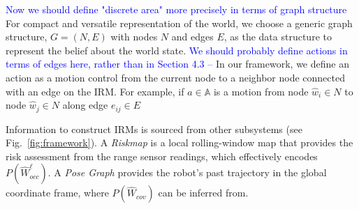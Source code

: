 \documentclass[letterpaper]{article} %
\newcommand{\ph}[1]{{\textbf{#1}:}} %
\begin{document}
\noindent
\textcolor{blue}{Now we should define "discrete area" more precisely in terms of graph structure} For compact and versatile representation of the world, we choose a generic graph structure, $G = (N, E)$ with nodes $N$ and edges $E$, as the data structure to represent the belief about the world state.
\textcolor{blue}{We should probably define actions in terms of edges here, rather than in Section 4.3 --}
In our framework, we define an action as a motion control from the current node to a neighbor node connected with an edge on the IRM.
For example, if $a \in \mathbb{A}$ is a motion from node $\hat{w}_i \in N$ to node $\hat{w}_j \in N$ along edge $e_{ij} \in E$

Information to construct IRMs is sourced from other subsystems (see Fig.~\ref{fig:framework}).
A \textit{Riskmap} is a local rolling-window map that provides the risk assessment from the range sensor readings, %
which effectively encodes $P(\hat{W}^\ell_{occ})$.
A \textit{Pose Graph} %
provides the robot's past trajectory in the global coordinate frame, where $P(\hat{W}_{cov})$ can be inferred from.
\end{document}
